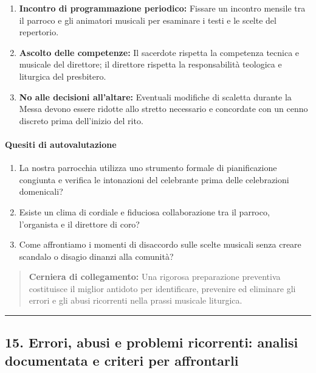 \documentclass[12pt,a4paper]{article}
\begin{document}
	\begin{enumerate}[label=\arabic*.,leftmargin=*]
		\item \textbf{Incontro di programmazione periodico:} Fissare un incontro mensile tra il parroco e gli animatori musicali per esaminare i testi e le scelte del repertorio.
		\item \textbf{Ascolto delle competenze:} Il sacerdote rispetta la competenza tecnica e musicale del direttore; il direttore rispetta la responsabilità teologica e liturgica del presbitero.
		\item \textbf{No alle decisioni all'altare:} Eventuali modifiche di scaletta durante la Messa devono essere ridotte allo stretto necessario e concordate con un cenno discreto prima dell'inizio del rito.
	\end{enumerate}
	
	\paragraph{Quesiti di autovalutazione}\label{quesiti-di-autovalutazione}
	
	\begin{enumerate}[label=\arabic*.,leftmargin=*]
		\item La nostra parrocchia utilizza uno strumento formale di pianificazione congiunta e verifica le intonazioni del celebrante prima delle celebrazioni domenicali?
		\item Esiste un clima di cordiale e fiduciosa collaborazione tra il parroco, l'organista e il direttore di coro?
		\item Come affrontiamo i momenti di disaccordo sulle scelte musicali senza creare scandalo o disagio dinanzi alla comunità?
	\end{enumerate}
	
	\begin{quote}
		\textbf{Cerniera di collegamento:} Una rigorosa preparazione preventiva costituisce il miglior antidoto per identificare, prevenire ed eliminare gli errori e gli abusi ricorrenti nella prassi musicale liturgica.
	\end{quote}
	
	\begin{center}\rule{0.5\linewidth}{0.5pt}\end{center}
	
	\subsection{15. Errori, abusi e problemi ricorrenti: analisi documentata e criteri per affrontarli}\label{errori-abusi-e-problemi-ricorrenti-analisi-documentata-e-criteri-per-affrontarli}
	
\end{document}
